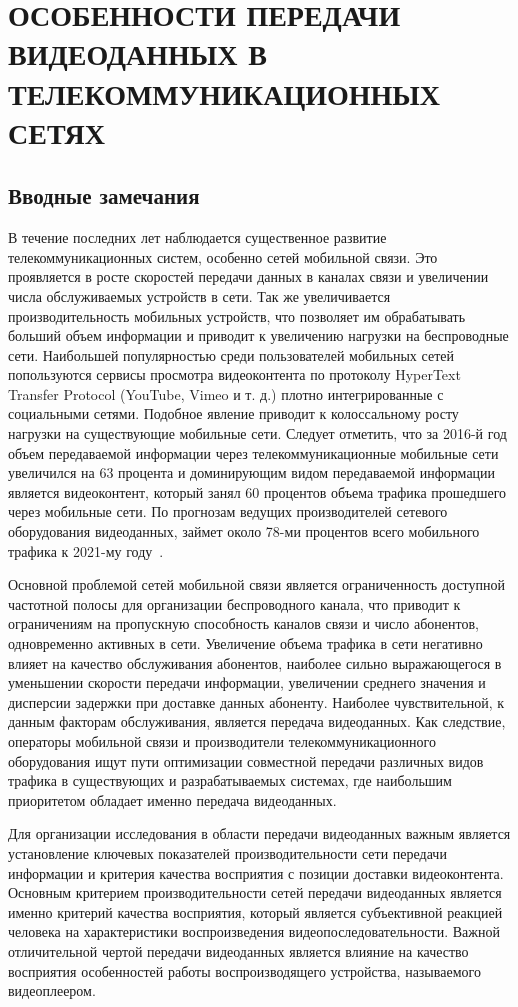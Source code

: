 \newpage
\chapter{ОСОБЕННОСТИ ПЕРЕДАЧИ ВИДЕОДАННЫХ В ТЕЛЕКОММУНИКАЦИОННЫХ СЕТЯХ}
\label{chap1}

\section{Вводные замечания}

В течение последних лет наблюдается существенное развитие телекоммуникационных систем, особенно сетей мобильной связи. Это проявляется в росте скоростей передачи данных в каналах связи и увеличении числа обслуживаемых устройств в сети. Так же увеличивается производительность мобильных устройств, что позволяет им обрабатывать больший объем информации и приводит к увеличению нагрузки на беспроводные сети. Наибольшей популярностью среди пользователей мобильных сетей попользуются сервисы просмотра видеоконтента по протоколу HyperText Transfer Protocol (YouTube, Vimeo и т. д.) плотно интегрированные с социальными сетями. Подобное явление приводит к колоссальному росту нагрузки на существующие мобильные сети. Следует отметить, что за 2016-й год объем передаваемой информации через телекоммуникационные мобильные сети увеличился на 63 процента и доминирующим видом передаваемой информации является видеоконтент, который занял 60 процентов объема трафика прошедшего через мобильные сети. По прогнозам ведущих производителей сетевого оборудования видеоданных, займет около 78-ми процентов всего мобильного трафика к 2021-му году~\cite{Cisco}.

Основной проблемой сетей мобильной связи является ограниченность доступной частотной полосы для организации беспроводного канала, что приводит к ограничениям на пропускную способность каналов связи и число абонентов, одновременно активных в сети. Увеличение объема трафика в сети негативно влияет на качество обслуживания абонентов, наиболее сильно выражающегося в уменьшении скорости передачи информации, увеличении среднего значения и дисперсии задержки при доставке данных абоненту. Наиболее чувствительной, к данным факторам обслуживания, является передача видеоданных. Как следствие, операторы мобильной связи и производители телекоммуникационного оборудования ищут пути оптимизации совместной передачи различных видов трафика в существующих и разрабатываемых системах, где наибольшим приоритетом обладает именно передача видеоданных.

Для организации исследования в области передачи видеоданных важным является установление ключевых показателей производительности сети передачи информации и критерия качества восприятия с позиции доставки видеоконтента. Основным критерием производительности сетей передачи видеоданных является именно критерий качества восприятия, который является субъективной реакцией человека на характеристики воспроизведения видеопоследовательности. Важной отличительной чертой передачи видеоданных является влияние на качество восприятия особенностей работы воспроизводящего устройства, называемого видеоплеером.

